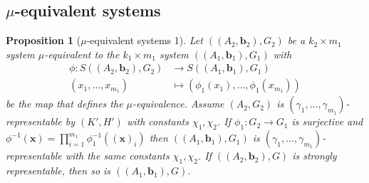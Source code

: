 \documentclass[10pt]{article}
\newtheorem{proposition}[theorem]{Proposition}
\begin{document}
\subsection{$\mu$-equivalent systems}

\begin{proposition}[$\mu$-equivalent systems 1] \label{p.mu-equivalent_1}
Let $((A_2,\mathbf{b}_2),G_2)$ be a $k_2\times m_1$ system $\mu$-equivalent to the $k_1\times m_1$ system $((A_1,\mathbf{b}_1),G_1)$ with
\begin{align}
	\phi:S((A_2,\mathbf{b}_2),G_2)&\longrightarrow S((A_1,\mathbf{b}_1),G_1) \nonumber \\
	(x_1,\ldots,x_{m_1}) &\longmapsto  \left(\phi_1(x_{1}),\ldots,\phi_1(x_{m_1})\right) \nonumber
\end{align}
be the map that defines the $\mu$-equivalence.
Assume $(A_2,G_2)$ is $(\gamma_1,\ldots,\gamma_{m_1})$-representable by $(K',H')$ with constants $\chi_1,\chi_2$. If 
$\phi_1:G_2\to G_1$ is surjective and $\phi^{-1}(\mathbf{x})=\prod_{i=1}^{m_1} \phi_1^{-1}((\mathbf{x})_i)$ then  $((A_1,\mathbf{b}_1),G_1)$ is $(\gamma_{1},\ldots,\gamma_{m_1})$-representable %
	with the same constants $\chi_1,\chi_2$. If $((A_2,\mathbf{b}_2),G)$ is strongly representable, then so is $((A_1,\mathbf{b}_1),G)$.
\end{proposition}
\end{document}
